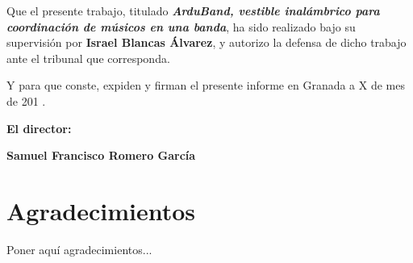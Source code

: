 Que el presente trabajo, titulado \textit{\textbf{ArduBand, vestible inalámbrico para coordinación de músicos en una banda}},
ha sido realizado bajo su supervisión por \textbf{Israel Blancas Álvarez}, y autorizo la defensa de dicho trabajo ante el tribunal
que corresponda.

\vspace{0.5cm}

Y para que conste, expiden y firman el presente informe en Granada a X de mes de 201 .

\vspace{1cm}

\textbf{El director:}

\vspace{5cm}

\noindent \textbf{Samuel Francisco Romero García}

\chapter*{Agradecimientos}
\thispagestyle{empty}

       \vspace{1cm}


Poner aquí agradecimientos...
